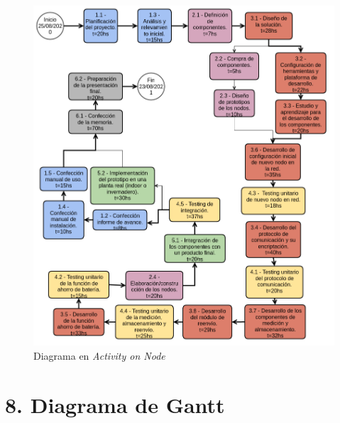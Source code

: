 \documentclass[11pt]{charter}
\begin{document}
\begin{figure}[htpb]
\centering 
\includegraphics[width=16cm]{./Figuras/aon.png}
\caption{Diagrama en \textit{Activity on Node}}
\label{fig:aon}
\end{figure}


\section{8. Diagrama de Gantt}
\label{sec:gantt}
\end{document}
